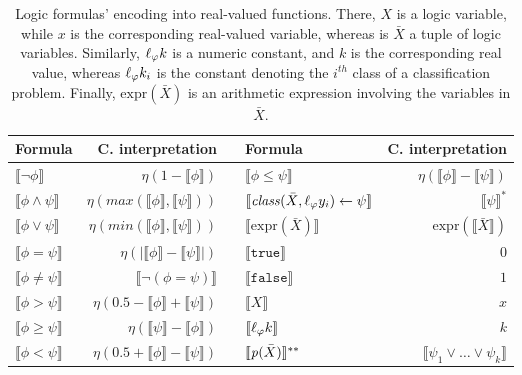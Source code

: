 
\begin{table}%
    \centering
    \caption[KILL Fuzzifier: Logic Formulae Encoding]{
        Logic formulas' encoding into real-valued functions.
        There, $X$ is a logic variable, while $x$ is the corresponding real-valued variable, whereas is $\bar{X}$ a tuple of logic variables.
        Similarly, $\ell_{\varphi}{k}$ is a numeric constant, and $k$ is the corresponding real value, whereas $\ell_{\varphi}{k}_i$ is the constant denoting the $i^{th}$ class of a classification problem.
        Finally, $\text{expr}(\bar{X})$ is an arithmetic expression involving the variables in $\bar{X}$.
    }
    \label{tab:logic-formulae}
    \begin{tabular}{l|r||cl|r}
        \textbf{Formula} & \textbf{C. interpretation} & & \textbf{Formula} & \textbf{C. interpretation}
        \\
        \hline\hline
        $\llbracket\neg \phi\rrbracket$ & $\eta(1 - \llbracket\phi\rrbracket)$ & & $\llbracket\phi \le \psi\rrbracket$  & $\eta(\llbracket\phi\rrbracket - \llbracket\psi\rrbracket)$
        \\
        $\llbracket\phi  \wedge \psi\rrbracket$ &  $\eta(max(\llbracket\phi\rrbracket, \llbracket\psi\rrbracket))$ & & $\llbracket \mathit{class}(\bar{X}, \ell_{\varphi}{y}_i) \leftarrow \psi \rrbracket$ & $\llbracket \psi \rrbracket^{*}$
        \\
        $\llbracket\phi  \vee \psi\rrbracket$ & $\eta(min(\llbracket\phi\rrbracket, \llbracket\psi\rrbracket))$ & & $\llbracket \text{expr}(\bar{X}) \rrbracket$ & $\text{expr}(\llbracket\bar{X}\rrbracket)$
        \\
        $\llbracket\phi = \psi\rrbracket$ & $\eta(|\llbracket\phi\rrbracket-\llbracket\psi\rrbracket|)$ & & $\llbracket \mathtt{true} \rrbracket$ & $0$
        \\
        $\llbracket\phi \ne \psi\rrbracket$ & $\llbracket \neg ( \phi = \psi )\rrbracket$ & & $\llbracket \mathtt{false} \rrbracket$ & $1$
        \\
        $\llbracket\phi > \psi\rrbracket$  & $\eta(0.5 - \llbracket\phi\rrbracket + \llbracket\psi\rrbracket) $ & & $\llbracket X \rrbracket$ & $x$
        \\
        $\llbracket\phi \ge \psi\rrbracket$ & $\eta(\llbracket\psi\rrbracket - \llbracket\phi\rrbracket)$ & & $\llbracket \ell_{\varphi}{k} \rrbracket$ & $k$
        \\
        $\llbracket\phi < \psi\rrbracket$  &  $\eta(0.5 + \llbracket\phi\rrbracket - \llbracket\psi\rrbracket)$ & & $\llbracket \mathit{p}(\bar{X}) \rrbracket^{**}$ & $\llbracket \psi_1 \vee \ldots \vee \psi_k \rrbracket$
        

\end{tabular}
\end{table}
